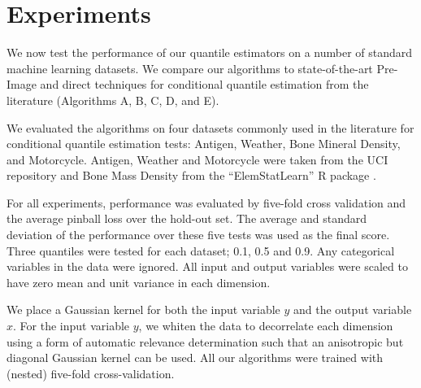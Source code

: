 \documentclass[twoside]{article} \usepackage{aistats2017}
\theoremstyle{definition}
\theoremstyle{theorem}
\begin{document}
% 
% 
	

	
\section{Experiments}
\label{sec:experiments}
		
	We now test the performance of our quantile estimators on a number of standard machine learning datasets. We compare our algorithms to state-of-the-art Pre-Image and direct techniques for conditional quantile estimation from the literature (Algorithms A, B, C, D, and E). %
	
	We evaluated the algorithms on four datasets commonly used in the literature for conditional quantile estimation tests: Antigen, Weather, Bone Mineral Density, and Motorcycle. Antigen, Weather and Motorcycle were taken from the UCI repository \citep{lichman2013uci} and Bone Mass Density from the ``ElemStatLearn'' R package \citep{hastie2005the}.
	
	For all experiments, performance was evaluated by five-fold cross validation and the average pinball loss over the hold-out set. The average and standard deviation of the performance over these five tests was used as the final score. Three quantiles were tested for each dataset; 0.1, 0.5 and 0.9. Any categorical variables in the data were ignored. All input and output variables were scaled to have zero mean and unit variance in each dimension.
	
	We place a Gaussian kernel for both the input variable $y$ and the output variable $x$. For the input variable $y$, we whiten the data to decorrelate each dimension using a form of automatic relevance determination \citep{rasmussen2006gaussian} such that an anisotropic but diagonal Gaussian kernel can be used. All our algorithms were trained with (nested) five-fold cross-validation.
	
\end{document}
